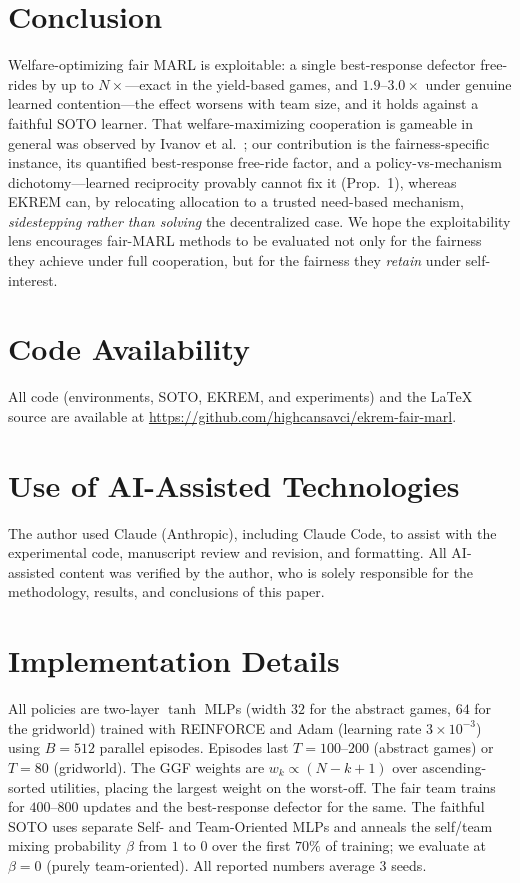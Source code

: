 \documentclass[conference, a4paper]{IEEEtran}
\begin{document}
\section{Conclusion}
Welfare-optimizing fair MARL is exploitable: a single best-response defector
free-rides by up to $N\times$---exact in the yield-based games, and
$1.9$--$3.0\times$ under genuine learned contention---the effect worsens with team
size, and it holds against a faithful SOTO learner. That welfare-maximizing
cooperation is gameable in general was observed by Ivanov et
al.~\cite{ivanov2023mediated}; our contribution is the fairness-specific instance,
its quantified best-response free-ride factor, and a policy-vs-mechanism
dichotomy---learned reciprocity provably cannot fix it (Prop.~1), whereas EKREM
can, by relocating allocation to a trusted need-based mechanism, \emph{sidestepping
rather than solving} the decentralized case. We hope the exploitability lens
encourages fair-MARL methods to be evaluated not only for the fairness they achieve
under full cooperation, but for the fairness they \emph{retain} under
self-interest.

\section*{Code Availability}
All code (environments, SOTO, EKREM, and experiments) and the \LaTeX{} source are
available at \url{https://github.com/highcansavci/ekrem-fair-marl}.

\section*{Use of AI-Assisted Technologies}
The author used Claude (Anthropic), including Claude Code, to assist with the
experimental code, manuscript review and revision, and formatting. All AI-assisted
content was verified by the author, who is solely responsible for the methodology,
results, and conclusions of this paper.

\appendices
\section{Implementation Details}
All policies are two-layer $\tanh$ MLPs (width $32$ for the abstract games, $64$
for the gridworld) trained with REINFORCE and Adam (learning rate
$3\times10^{-3}$) using $B{=}512$ parallel episodes. Episodes last $T{=}100$--$200$
(abstract games) or $T{=}80$ (gridworld). The GGF weights are
$w_k \propto (N{-}k{+}1)$ over ascending-sorted utilities, placing the largest
weight on the worst-off. The fair team trains for $400$--$800$ updates and the
best-response defector for the same. The faithful SOTO uses separate Self- and
Team-Oriented MLPs and anneals the self/team mixing probability $\beta$ from $1$
to $0$ over the first $70\%$ of training; we evaluate at $\beta{=}0$ (purely
team-oriented). All reported numbers average $3$ seeds.
\end{document}
